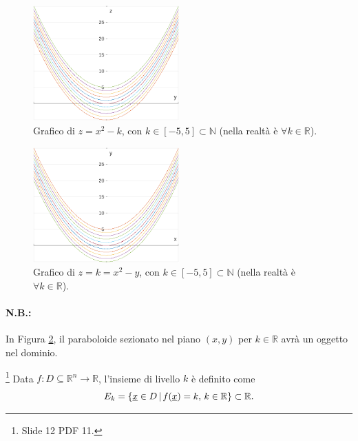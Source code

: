 \begin{figure}
\centering
\includegraphics[width=0.5\textwidth]{Analisi2/figures/esempio_z=x^2-k.png}
    \caption{Grafico di $z=x^2-k$, con $k\in[-5,5]\subset\mathbb N$ (nella realtà è $\forall k\in\mathbb R$).}\label{fig:esempio_z=x^2-k}
\end{figure}

\begin{figure}
\centering
\includegraphics[width=0.5\textwidth]{Analisi2/figures/esempio_z=x^2-y.png}
    \caption{Grafico di $z=k=x^2-y$, con $k\in[-5,5]\subset\mathbb N$ (nella realtà è $\forall k\in\mathbb R$).}\label{fig:esempio_z=k=x^2-y}
\end{figure}

\paragraph{N.B.:} In Figura \ref{fig:esempio_z=k=x^2-y}, il paraboloide sezionato nel piano $(x,y)$ per $k\in\mathbb R$ avrà un oggetto nel dominio.

\begin{definition}\footnote{Slide 12 PDF 11.}
    Data $f:D\subseteq\mathbb R^n\rightarrow\mathbb R$, l'insieme di livello $k$ è definito come
    \begin{equation}\label{eq:insime_livello_k_Rn}
        E_k=\{\uline x\in D\,|\, f(\uline x)=k,\, k\in\mathbb R\}\subset\mathbb R.
    \end{equation}
\end{definition}

